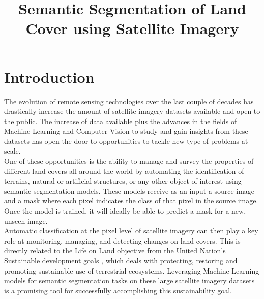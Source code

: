 \documentclass[conference]{IEEEtran}
\begin{document}
\title{Semantic Segmentation of Land Cover using Satellite Imagery \\}
\author{
\and
{}
\and
{}
}
\maketitle


\section{Introduction}
The evolution of remote sensing technologies over the last couple of decades has drastically increase the amount of satellite imagery datasets available and open to the public. The increase of data available plus the advances in the fields of Machine Learning and Computer Vision to study and gain insights from these datasets has open the door to opportunities to tackle new type of problems at scale. \\ \indent
One of these opportunities is the ability to manage and survey the properties of different land covers all around the world by automating the identification of terrains, natural or artificial structures, or any other object of interest using semantic segmentation models. These models receive as an input a source image and a mask where each pixel indicates the class of that pixel in the source image. Once the model is trained, it will ideally be able to predict a mask for a new, unseen image.  \\ \indent
Automatic classification at the pixel level of satellite imagery can then play a key role at monitoring, managing, and detecting changes on land covers. This is directly related to the Life on Land objective from the United Nation's Sustainable development goals  \cite{united_nations}, which deals with protecting, restoring and promoting sustainable use of terrestrial ecosystems. Leveraging Machine Learning models for semantic segmentation tasks on these large satellite imagery datasets is a promising tool for successfully accomplishing this sustainability goal.
\end{document}
